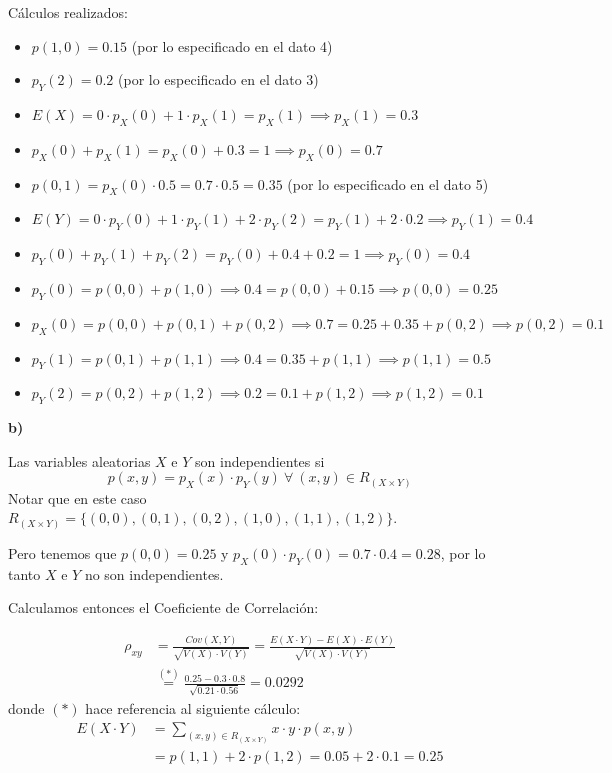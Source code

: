 \documentclass[11pt]{article}
\begin{document}
C\'alculos realizados: 
\begin{itemize}
    \item $p(1,0) = 0.15$ (por lo especificado en el dato 4)
    \item $p_Y(2) = 0.2$ (por lo especificado en el dato 3)
    \item $E(X) = 0 \cdot p_X(0) + 1 \cdot p_X(1) = p_X(1) \implies p_X(1) = 0.3$
    \item $p_X(0) + p_X(1) = p_X(0) + 0.3 = 1 \implies p_X(0) = 0.7$
    \item $p(0,1) = p_X(0) \cdot 0.5 = 0.7 \cdot 0.5 = 0.35$ (por lo especificado en el dato 5)
    \item $E(Y) = 0 \cdot p_Y(0) + 1 \cdot p_Y(1) + 2 \cdot p_Y(2) = p_Y(1) + 2 \cdot 0.2 \implies p_Y(1) = 0.4$
    \item $p_Y(0) + p_Y(1) + p_Y(2) = p_Y(0) + 0.4 + 0.2 = 1 \implies p_Y(0) = 0.4$
    \item $p_Y(0) = p(0,0) + p(1,0) \implies 0.4 = p(0,0) + 0.15 \implies p(0,0) = 0.25$
    \item $p_X(0) = p(0,0) + p(0,1) + p(0,2) \implies 0.7 = 0.25 + 0.35 + p(0,2) \implies p(0,2) = 0.1$
    \item $p_Y(1) = p(0,1) + p(1,1) \implies 0.4 = 0.35 + p(1,1) \implies p(1,1) = 0.5$
    \item $p_Y(2) = p(0,2) + p(1,2) \implies 0.2 = 0.1 + p(1,2) \implies p(1,2) = 0.1$
\end{itemize}


\textbf{b)}

Las variables aleatorias $X$ e $Y$ son independientes si $$p(x,y) = p_X(x) \cdot p_Y(y) \ \forall\ (x,y) \in R_{(X \times Y)}$$
Notar que en este caso $R_{(X \times Y)} = \{(0,0),(0,1),(0,2),(1,0),(1,1),(1,2)\}$.

Pero tenemos que $p(0,0) = 0.25$ y $p_X(0) \cdot p_Y(0) = 0.7 \cdot 0.4 = 0.28$, por lo tanto $X$ e $Y$ no son independientes. 

Calculamos entonces el Coeficiente de Correlaci\'on:

\begin{align*}
    \rho_{xy} &= \frac{Cov(X,Y)}{\sqrt{V(X) \cdot V(Y)}} = \frac{E(X \cdot Y) - E(X) \cdot E(Y)}{\sqrt{V(X) \cdot V(Y)}} \\
              &\stackrel{(*)}{=} \frac{0.25 - 0.3 \cdot 0.8}{\sqrt{0.21 \cdot 0.56}} = 0.0292
\end{align*}
donde $(*)$ hace referencia al siguiente c\'alculo:
\begin{align*}
    E(X \cdot Y) &= \sum_{(x,y) \in R_{(X \times Y)}} x \cdot y \cdot p(x,y) \\
                 &= p(1,1) + 2 \cdot p(1,2) = 0.05 + 2 \cdot 0.1 = 0.25 
\end{align*}
\end{document}
